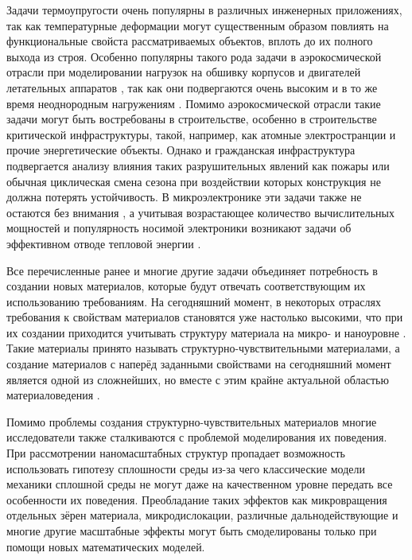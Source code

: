 
{\actuality}
Задачи термоупругости очень популярны в различных инженерных приложениях, так как температурные деформации могут существенным образом повлиять на функциональные свойста рассматриваемых объектов, вплоть до их полного выхода из строя. Особенно популярны такого рода задачи в аэрокосмической отрасли при моделировании нагрузок на обшивку корпусов и двигателей летательных аппаратов \cite{Aerocosmos1, Aerocosmos2, Aerocosmos3}, так как они подвергаются очень высоким и в то же время неоднородным нагружениям \cite{Aerocosmos4, Aerocosmos5, Aerocosmos6, Aerocosmos7}. Помимо аэрокосмической отрасли такие задачи могут быть востребованы в строительстве, особенно в строительстве критической инфраструктуры, такой, например, как атомные электространции \cite{StroyMech1, StroyMech2} и прочие энергетические объекты. Однако и гражданская инфраструктура подвергается анализу влияния таких разрушительных явлений как пожары \cite{StroyMech3, StroyMech4} или обычная циклическая смена сезона \cite{StroyMech5, StroyMech6} при воздействии которых конструкция не должна потерять устойчивость. В микроэлектронике эти задачи также не остаются без внимания \cite{MicroElectronic1, MicroElectronic2}, а учитывая возрастающее количество вычислительных мощностей и популярность носимой электроники возникают задачи об эффективном отводе тепловой энергии \cite{MicroElectronic3}.

Все перечисленные ранее и многие другие задачи объединяет потребность в создании новых материалов, которые будут отвечать соответствующим их использованию требованиям. На сегодняшний момент, в некоторых отраслях требования к свойствам материалов становятся уже настолько высокими, что при их создании приходится учитывать структуру материала на микро- и наноуровне \cite{MaterialStructure1, MaterialStructure2, MaterialStructure3}. Такие материалы принято называть структурно-чувствительными материалами, а создание материалов с наперёд заданными свойствами на сегодняшний момент является одной из сложнейших, но вместе с этим крайне актуальной областью материаловедения \cite{Auxetics}.

Помимо проблемы создания структурно-чувствительных материалов многие исследователи также сталкиваются с проблемой моделирования их поведения. При рассмотрении наномасштабных структур пропадает возможность использовать гипотезу сплошности среды из-за чего классические модели механики сплошной среды не могут даже на качественном уровне передать все особенности их поведения. Преобладание таких эффектов как микровращения отдельных зёрен материала, микродислокации, различные дальнодействующие и многие другие масштабные эффекты могут быть смоделированы только при помощи новых математических моделей.


